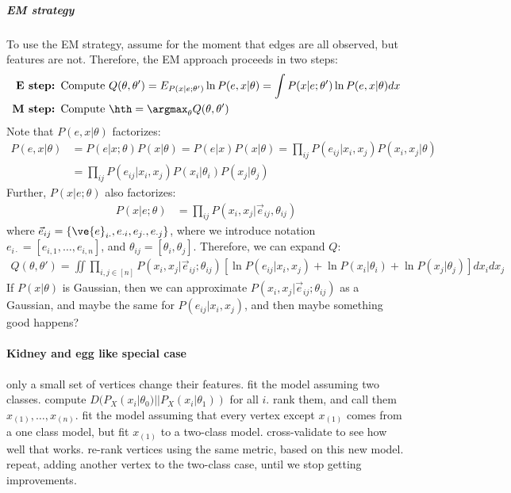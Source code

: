 \subparagraph{EM strategy}

To use the EM strategy, assume for the moment that edges are all observed, but features are not.  Therefore, the EM approach proceeds in two steps:
\begin{align*}
\textbf{E step: } \text{Compute } & Q(\theta,\theta') = E_{P(x | e; \theta')} \ln P(e,x | \theta) = \int P(x | e; \theta') \ln P(e,x | \theta) dx\\
\textbf{M step: } \text{Compute }& \hth = \argmax_{\theta} Q(\theta,\theta')
\end{align*}
Note that $P(e,x|\theta)$ factorizes:
\begin{align}
	P(e,x|\theta) &= P(e | x; \theta) P(x | \theta) = P(e|x) P(x|\theta) = \prod_{ij} P(e_{ij} | x_i,x_j) P(x_i, x_j | \theta) \nonumber \\ 
	&=  \prod_{ij} P(e_{ij} | x_i,x_j) P(x_i| \theta_i) P(x_j | \theta_j)
\end{align}
Further, $P(x|e;\theta)$ also factorizes:
\begin{align}
	P(x|e;\theta) &= \prod_{ij} P(x_i, x_j | \vec{e}_{ij}, \theta_{ij} )
\end{align}
where $\vec{e}_{ij}=\{\ve{e}_{i\cdot}, e_{\cdot i}, e_{j\cdot}, e_{\cdot j}\}$, where we introduce notation $e_{i\cdot}=[e_{i,1}, \ldots, e_{i,n}]$, and $\theta_{ij}=[\theta_i,\theta_j]$.  Therefore, we can expand $Q$:
\begin{align}
	Q(\theta,\theta') = \iint \prod_{i,j \in [n]} P(x_i,x_j | \vec{e}_{ij}; \theta_{ij}) [\ln P(e_{ij}| x_i, x_j) + \ln P(x_i | \theta_i) + \ln P(x_j | \theta_j)] dx_i dx_j
\end{align}
If $P(x|\theta)$ is Gaussian, then we can approximate $P(x_i,x_j | \vec{e}_{ij}; \theta_{ij})$ as a Gaussian, and maybe the same for $P(e_{ij} | x_i,x_j)$, and then maybe something good happens?



\paragraph{Kidney and egg like special case}

only a small set of vertices change their features.  fit the model assuming two classes.  compute  $D(P_X(x_i | \theta_0) || P_X(x_i | \theta_1))$ for all $i$.  rank them, and call them $x_{(1)}, \ldots, x_{(n)}$.  fit the model assuming that every vertex except $x_{(1)}$ comes from a one class model, but fit $x_{(1)}$ to a two-class model.  cross-validate to see how well that works.  re-rank vertices using the same metric, based on this new model.  repeat, adding another vertex to the two-class case, until we stop getting improvements.

